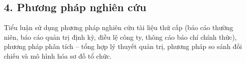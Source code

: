 \subsection*{4. Phương pháp nghiên cứu}
Tiểu luận sử dụng phương pháp nghiên cứu tài liệu thứ cấp (báo cáo thường niên, báo cáo quản trị định kỳ, điều lệ công ty, thông cáo báo chí chính thức), phương pháp phân tích -- tổng hợp lý thuyết quản trị, phương pháp so sánh đối chiếu và mô hình hóa sơ đồ tổ chức.
